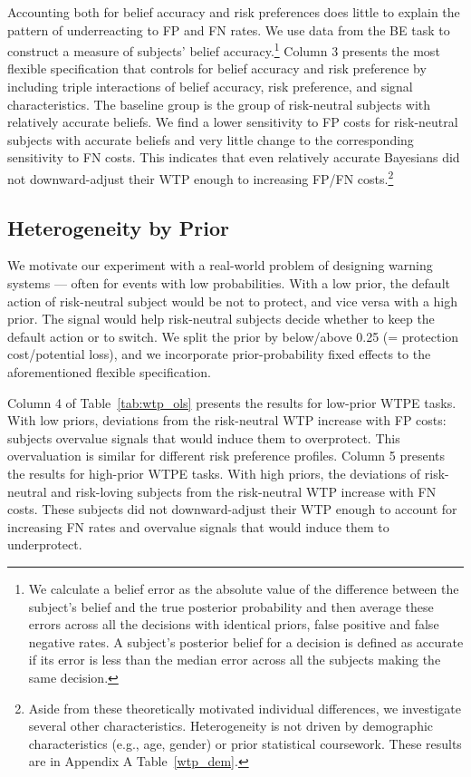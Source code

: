 \documentclass[12pt,a4paper]{article}
\begin{document}
Accounting both for belief accuracy and risk preferences does little to explain the pattern of underreacting to FP and FN rates. We use data from the BE task to construct a measure of subjects' belief accuracy.\footnote{We calculate a belief error as the absolute value of the difference between the subject's belief and the true posterior probability and then average these errors across all the decisions with identical priors, false positive and false negative rates. A subject's posterior belief for a decision is defined as accurate if its error is less than the median error across all the subjects making the same decision.} Column 3 presents the most flexible specification that controls for belief accuracy and risk preference by including triple interactions of belief accuracy, risk preference, and signal characteristics. The baseline group is the group of risk-neutral subjects with relatively accurate beliefs. We find a lower sensitivity to FP costs for risk-neutral subjects with accurate beliefs and very little change to the corresponding sensitivity to FN costs. This indicates that even relatively accurate Bayesians did not downward-adjust their WTP enough to increasing FP/FN costs.\footnote{Aside from these theoretically motivated individual differences, we investigate several other characteristics.  Heterogeneity is not driven by demographic characteristics (e.g., age, gender) or prior statistical coursework.  These results are in Appendix A Table~\ref{wtp_dem}.}
  

\subsection{Heterogeneity by Prior}

We motivate our experiment with a real-world problem of designing warning systems --- often for events with low probabilities. With a low prior, the default action of risk-neutral subject would be not to protect, and vice versa with a high prior. The signal would help risk-neutral subjects decide whether to keep the default action or to switch. We split the prior by below/above 0.25 (= protection cost/potential loss), and we incorporate prior-probability fixed effects to the aforementioned flexible specification. 

Column 4 of Table~\ref{tab:wtp_ols} presents the results for low-prior WTPE tasks. With low priors, deviations from the risk-neutral WTP increase with FP costs: subjects overvalue signals that would induce them to overprotect. This overvaluation is similar for different risk preference profiles. Column 5 presents the results for high-prior WTPE tasks. With high priors, the deviations of risk-neutral and risk-loving subjects from the risk-neutral WTP increase with FN costs. These subjects did not downward-adjust their WTP enough to account for increasing FN rates and overvalue signals that would induce them to underprotect. 
\end{document}
